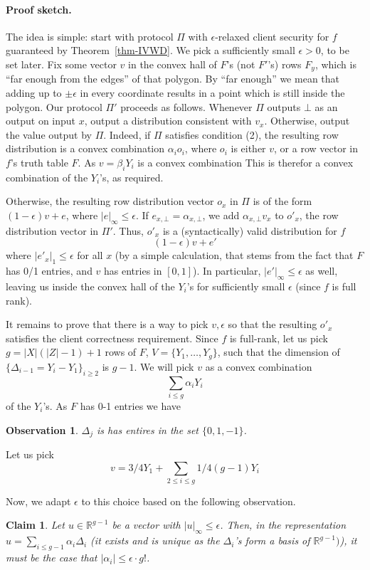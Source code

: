 \documentclass[a4paper]{article}
\newtheorem{claim}[theorem]{Claim}
\newtheorem{observation}{Observation}
\newcommand{\R}{\mathbb{R}}
\begin{document}
\paragraph{Proof sketch.}

The idea is simple: start with protocol $\Pi$ with  $\epsilon$-relaxed client security for $f$ guaranteed by Theorem~\ref{thm-IVWD}. We pick a sufficiently small $\epsilon>0$, to be set later. Fix some vector $v$ in the convex hall of $F$'s (not $F'$'s) rows $F_y$, which is ``far enough from the edges'' of that polygon.
By ``far enough'' we mean that adding up to $\pm\epsilon$ in every coordinate
results in a point which is still inside the polygon.
Our protocol $\Pi'$ proceeds as follows. Whenever $\Pi$ outputs $\bot$ as an output on input $x$, output  a distribution consistent with $v_x$. Otherwise, output the value output by $\Pi$. 
Indeed, if $\Pi$ satisfies condition (2), the resulting row distribution is a convex combination $\alpha_i o_i$, where $o_i$ is either $v$, or a row vector in $f$'s truth table $F$. As $v = \beta_i Y_i$ is a convex combination 
This is therefor a convex combination of the $Y_i$'s, as required.

Otherwise, the resulting row distribution vector $o_x$ in $\Pi$ is of the form $(1-\epsilon)v+e$, where $|e|_\infty\leq \epsilon$. 
If $e_{x,\bot}=\alpha_{x,\bot}$, we add $\alpha_{x,\bot}v_x$ to $o'_x$,
the row distribution vector in $\Pi'$.
Thus, $o'_x$ is a (syntactically) valid distribution for $f$ \[(1-\epsilon)v+e'\] where $|e'_x|_1\leq \epsilon$ for all $x$ (by a simple calculation, that stems from the fact that $F$ has 0/1 entries, and $v$ has entries in $[0,1]$). In particular, $|e'|_\infty\leq \epsilon$ as well, leaving us inside the convex hall of the $Y_i$'s for sufficiently small $\epsilon$ (since $f$ is full rank). 

It remains to prove that there is a way to pick $v,\epsilon$ 
so that the resulting $o'_x$ satisfies the client correctness requirement.
Since $f$ is full-rank, let us pick $g=|X|(|Z|-1)+1$ rows of $F$, $V = \{Y_1,\ldots,Y_g\}$, such that the dimension of $\{\Delta_{i-1} = Y_i - Y_1\}_{i\geq 2}$ is $g-1$. We will pick $v$ as a convex combination
\[\sum_{i\leq g}\alpha_iY_i\]
of the $Y_i$'s.
As $F$ has 0-1 entries we have 
\begin{observation}\label{obs-1}
$\Delta_j$ is has entires in the set $\{0,1,-1\}$.
\end{observation}
Let us pick
\[v = 3/4Y_1 + \sum_{2\leq i\leq g}1/4(g-1) Y_i\]

Now, we adapt $\epsilon$ to this choice based on the following observation.
\begin{claim}\label{clm-proj}
Let $u\in \R^{g-1}$ be a vector with $|u|_\infty \leq \epsilon$. 
Then, in the representation $u = \sum_{i\leq g-1}\alpha_i\Delta_i$
(it exists and is unique as the $\Delta_i$'s form a basis of $\R^{g-1})$),
it must be the case that $|\alpha_i|\leq \epsilon \cdot g!$.  
\end{claim}
\end{document}
